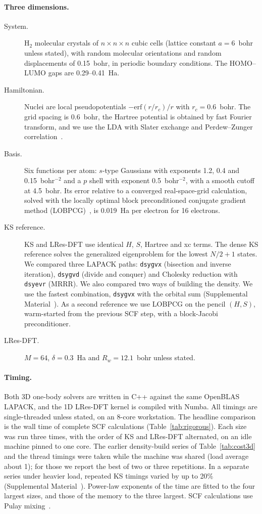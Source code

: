 \documentclass[aps,prb,twocolumn,superscriptaddress,floatfix,longbibliography]{revtex4-2}
\theoremstyle{remark}
\newcommand{\SM}{Supplemental Material~\cite{SM}}
\begin{document}
\paragraph*{Three dimensions.}
\begin{description}
\item[System.] H$_2$ molecular crystals of $n\times n\times n$ cubic cells (lattice constant $a=6$~bohr unless stated), with
random molecular orientations and random displacements of 0.15~bohr, in periodic boundary conditions. The HOMO--LUMO gaps are
0.29--0.41~Ha.
\item[Hamiltonian.] Nuclei are local pseudopotentials $-\mathrm{erf}(r/r_c)/r$ with $r_c=0.6$~bohr. The grid spacing is
0.6~bohr, the Hartree potential is obtained by fast Fourier transform, and we use the LDA with Slater exchange and
Perdew--Zunger correlation~\cite{PZ1981}.
\item[Basis.] Six functions per atom: $s$-type Gaussians with exponents 1.2, 0.4 and 0.15~bohr$^{-2}$ and a $p$ shell with
exponent 0.5~bohr$^{-2}$, with a smooth cutoff at 4.5~bohr. Its error relative to a converged real-space-grid calculation,
solved with the locally optimal block preconditioned conjugate gradient method (LOBPCG)~\cite{LOBPCG2001}, is 0.019~Ha per
electron for 16 electrons.
\item[KS reference.] KS and LRes-DFT use identical $H$, $S$, Hartree and xc terms. The dense KS reference solves the
generalized eigenproblem for the lowest $N/2+1$ states. We compared three LAPACK paths: \texttt{dsygvx} (bisection and
inverse iteration), \texttt{dsygvd} (divide and conquer) and Cholesky reduction with \texttt{dsyevr} (MRRR). We also compared
two ways of building the density. We use the fastest combination, \texttt{dsygvx} with the orbital sum (\SM). As a second
reference we use LOBPCG on the pencil $(H,S)$, warm-started from the previous SCF step, with a block-Jacobi preconditioner.
\item[LRes-DFT.] $M=64$, $\delta=0.3$~Ha and $R_w=12.1$~bohr unless stated.
\end{description}

\paragraph*{Timing.} Both 3D one-body solvers are written in C++ against the same OpenBLAS LAPACK, and the 1D LRes-DFT
kernel is compiled with Numba. All timings are single-threaded unless stated, on an 8-core workstation. The headline
comparison is the wall time of complete SCF calculations (Table~\ref{tab:rigorous}). Each size was run three times, with
the order of KS and LRes-DFT alternated, on an idle machine pinned to one core. The earlier density-build series of
Table~\ref{tab:cost3d} and the thread timings were taken while the machine was shared (load average about 1); for those we
report the best of two or three repetitions. In a separate series under heavier load, repeated KS timings varied by up to
20\% (\SM). Power-law exponents of the time are fitted to the four largest sizes, and those of the memory to the three
largest. SCF calculations use Pulay mixing~\cite{Pulay1980}.
\end{document}
